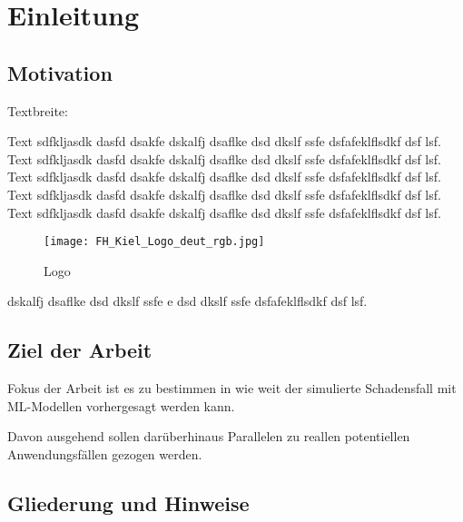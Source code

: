 \chapter{Einleitung}
\label{ch:einleitung}

\section{Motivation}
\label{sec:motivation}
Textbreite:\the\textwidth

Text sdfkljasdk dasfd dsakfe dskalfj dsaflke dsd dkslf ssfe dsfafeklflsdkf dsf lsf. Text sdfkljasdk dasfd dsakfe dskalfj dsaflke dsd dkslf ssfe dsfafeklflsdkf dsf lsf. Text sdfkljasdk dasfd dsakfe dskalfj dsaflke dsd dkslf ssfe dsfafeklflsdkf dsf lsf. Text sdfkljasdk dasfd dsakfe dskalfj dsaflke dsd dkslf ssfe dsfafeklflsdkf dsf lsf. Text sdfkljasdk dasfd dsakfe dskalfj dsaflke dsd dkslf ssfe dsfafeklflsdkf dsf lsf.

\begin{figure}[ht]
	\centering
	\texttt{[image: FH\_Kiel\_Logo\_deut\_rgb.jpg]}
	\caption{Logo}
	\label{fig:fhlogo}
\end{figure}

dskalfj dsaflke dsd dkslf ssfe e dsd dkslf ssfe dsfafeklflsdkf dsf lsf. \cite{gasparovic1969}
\section{Ziel der Arbeit}
\label{sec:ziel}
Fokus der Arbeit ist es zu bestimmen in wie weit der simulierte Schadensfall mit ML-Modellen vorhergesagt werden kann.

Davon ausgehend sollen darüberhinaus Parallelen zu reallen potentiellen Anwendungsfällen gezogen werden. 

\section{Gliederung und Hinweise}
\label{sec:gliederung}

\blindtext[2]

\blindtext[3]

\blindtext[5]

\blindtext[3]